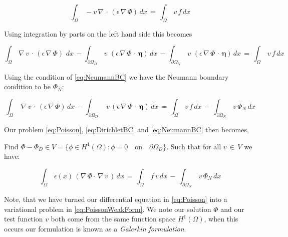 \documentclass[10pt]{report}
\numberwithin{equation}{section}
\begin{document}
$$ \int_{\Omega} \, - v \, \nabla  \, \cdot \, \left(\epsilon \, \nabla \, \Phi \right) \, dx \, =  \, \int_{\Omega} \, v \, f \, dx $$

\noindent
Using integration by parts on the left hand side this becomes


\vspace{2mm}


\begin{equation}
\int_{\Omega} \, \nabla  \, v  \, \cdot \, \left(\epsilon \, \nabla \, \Phi \right) \, \, dx \, 
-\int_{\partial \Omega_{D}} \, v \, \, \left(\epsilon \, \nabla \, \Phi \, \cdot \, \boldsymbol \eta \right) \, dx \,  
-\int_{\partial \Omega_{N}} \, v \, \, \left(\epsilon \, \nabla \, \Phi \, \cdot \, \boldsymbol \eta \right) \, dx \,  
=  \, \int_{\Omega} \, v \, f \, dx 
\end{equation}


\vspace{2mm}


\noindent
Using the condition of \eqref{eq:NeumannBC} we have  the Neumann boundary condition to be  $\Phi_{N}$:


\vspace{2mm}


$$
\int_{\Omega} \,  \,  \nabla \, v \, \cdot \, \left(\epsilon \, \nabla \, \Phi \right) \,  dx \, 
-\int_{\partial \Omega_{D}} \,  \,  v \,\left(\epsilon \, \nabla \, \Phi \, \cdot \, \boldsymbol \eta \right) \,dx \,  
=  \, \int_{\Omega} \, v \, f \,   dx  \, - \, \int_{\partial \Omega_{N}} \,  v \, \Phi_{N} \, dx
$$


\noindent
Our problem \eqref{eq:Poisson}, \eqref{eq:DirichletBC} and \eqref{eq:NeumannBC}  then becomes, 

\begin{center}
Find $\Phi-\Phi_{D} \in V = \{ \phi \in H^{1}(\Omega): \phi = 0 \quad \text{on} \quad \partial \Omega_{D} \}$. Such that for all $v \, \in \, V$ we have:
\end{center}


\begin{equation} \label{eq:PoissonWeakForm}
\int_{\Omega} \, \epsilon(x) \, \left(  \nabla \, \Phi \cdot \,
 \nabla \, v \, \right) \, dx \, 
=  \, \int_{\Omega} \,  f \, v \, dx  \, - \, \int_{\partial \Omega_{N}} \,  v \, \Phi_{N} \, dx
\end{equation}

\vspace{3mm}


\noindent
Note, that we have turned our differential equation in \eqref{eq:Poisson} into a variational problem in \eqref{eq:PoissonWeakForm}.  We note our solution $\Phi$ and our test function $v$ both come from the same function space $H^{1}(\Omega)$, when this occurs our formulation is known as a \textit{Galerkin formulation}.   
\end{document}

